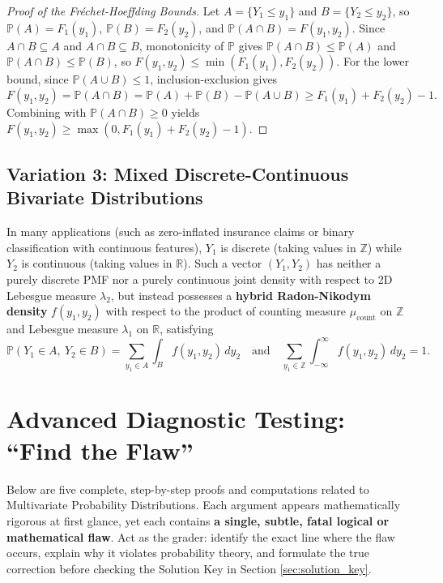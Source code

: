\documentclass[11pt, letterpaper]{article}
\theoremstyle{definition}
\theoremstyle{remark}
\newcommand{\R}{\mathbb{R}}
\newcommand{\Z}{\mathbb{Z}}
\newcommand{\Prob}{\mathbb{P}}
\begin{document}
\begin{proof}[Proof of the Fr\'{e}chet-Hoeffding Bounds]
Let $A = \{Y_1 \le y_1\}$ and $B = \{Y_2 \le y_2\}$, so $\Prob(A) = F_1(y_1)$, $\Prob(B) = F_2(y_2)$, and $\Prob(A \cap B) = F(y_1, y_2)$. Since $A \cap B \subseteq A$ and $A \cap B \subseteq B$, monotonicity of $\Prob$ gives $\Prob(A \cap B) \le \Prob(A)$ and $\Prob(A \cap B) \le \Prob(B)$, so $F(y_1, y_2) \le \min(F_1(y_1), F_2(y_2))$. For the lower bound, since $\Prob(A \cup B) \le 1$, inclusion-exclusion gives
\[
F(y_1, y_2) = \Prob(A \cap B) = \Prob(A) + \Prob(B) - \Prob(A \cup B) \ge F_1(y_1) + F_2(y_2) - 1.
\]
Combining with $\Prob(A \cap B) \ge 0$ yields $F(y_1, y_2) \ge \max(0, F_1(y_1) + F_2(y_2) - 1)$.
\end{proof}

\subsection{Variation 3: Mixed Discrete-Continuous Bivariate Distributions}

In many applications (such as zero-inflated insurance claims or binary classification with continuous features), $Y_1$ is discrete (taking values in $\Z$) while $Y_2$ is continuous (taking values in $\R$). Such a vector $(Y_1, Y_2)$ has neither a purely discrete PMF nor a purely continuous joint density with respect to 2D Lebesgue measure $\lambda_2$, but instead possesses a \textbf{hybrid Radon-Nikodym density} $f(y_1, y_2)$ with respect to the product of counting measure $\mu_{\text{count}}$ on $\Z$ and Lebesgue measure $\lambda_1$ on $\R$, satisfying
\[
\Prob(Y_1 \in A,\ Y_2 \in B) = \sum_{y_1 \in A} \int_{B} f(y_1, y_2)\, dy_2 \quad \text{and} \quad \sum_{y_1 \in \Z} \int_{-\infty}^{\infty} f(y_1, y_2)\, dy_2 = 1.
\]

\newpage
\section{Advanced Diagnostic Testing: ``Find the Flaw''}

Below are five complete, step-by-step proofs and computations related to Multivariate Probability Distributions. Each argument appears mathematically rigorous at first glance, yet each contains \textbf{a single, subtle, fatal logical or mathematical flaw}. Act as the grader: identify the exact line where the flaw occurs, explain why it violates probability theory, and formulate the true correction before checking the Solution Key in Section \ref{sec:solution_key}.
\end{document}
